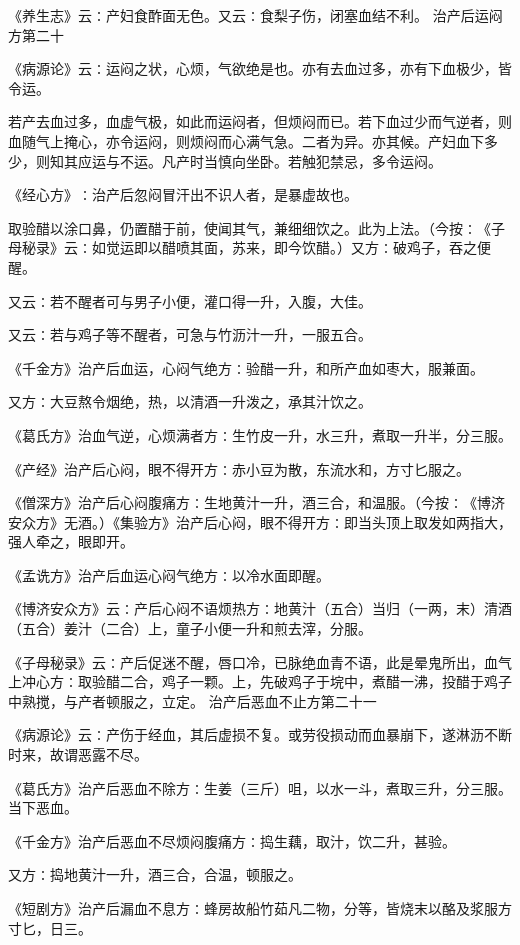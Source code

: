 \documentclass[a4paper,12pt,UTF8,twoside]{ctexbook}
\begin{document}
《养生志》云∶产妇食酢面无色。又云∶食梨子伤，闭塞血结不利。
治产后运闷方第二十

《病源论》云∶运闷之状，心烦，气欲绝是也。亦有去血过多，亦有下血极少，皆令运。

若产去血过多，血虚气极，如此而运闷者，但烦闷而已。若下血过少而气逆者，则血随气上掩心，亦令运闷，则烦闷而心满气急。二者为异。亦其候。产妇血下多少，则知其应运与不运。凡产时当慎向坐卧。若触犯禁忌，多令运闷。

《经心方》∶治产后忽闷冒汗出不识人者，是暴虚故也。

取验醋以涂口鼻，仍置醋于前，使闻其气，兼细细饮之。此为上法。（今按∶《子母秘录》云∶如觉运即以醋喷其面，苏来，即今饮醋。）又方∶破鸡子，吞之便醒。

又云∶若不醒者可与男子小便，灌口得一升，入腹，大佳。

又云∶若与鸡子等不醒者，可急与竹沥汁一升，一服五合。

《千金方》治产后血运，心闷气绝方∶验醋一升，和所产血如枣大，服兼面。

又方∶大豆熬令烟绝，热，以清酒一升泼之，承其汁饮之。

《葛氏方》治血气逆，心烦满者方∶生竹皮一升，水三升，煮取一升半，分三服。

《产经》治产后心闷，眼不得开方∶赤小豆为散，东流水和，方寸匕服之。

《僧深方》治产后心闷腹痛方∶生地黄汁一升，酒三合，和温服。（今按∶《博济安众方》无酒。）《集验方》治产后心闷，眼不得开方∶即当头顶上取发如两指大，强人牵之，眼即开。

《孟诜方》治产后血运心闷气绝方∶以冷水面即醒。

《博济安众方》云∶产后心闷不语烦热方∶地黄汁（五合）当归（一两，末）清酒（五合）姜汁（二合）上，童子小便一升和煎去滓，分服。

《子母秘录》云∶产后促迷不醒，唇口冷，已脉绝血青不语，此是晕鬼所出，血气上冲心方∶取验醋二合，鸡子一颗。上，先破鸡子于垸中，煮醋一沸，投醋于鸡子中熟搅，与产者顿服之，立定。
治产后恶血不止方第二十一

《病源论》云∶产伤于经血，其后虚损不复。或劳役损动而血暴崩下，遂淋沥不断时来，故谓恶露不尽。

《葛氏方》治产后恶血不除方∶生姜（三斤）咀，以水一斗，煮取三升，分三服。当下恶血。

《千金方》治产后恶血不尽烦闷腹痛方∶捣生藕，取汁，饮二升，甚验。

又方∶捣地黄汁一升，酒三合，合温，顿服之。

《短剧方》治产后漏血不息方∶蜂房故船竹茹凡二物，分等，皆烧末以酪及浆服方寸匕，日三。
\end{document}
